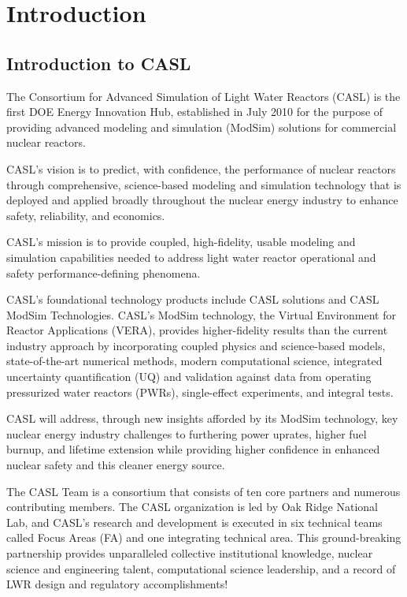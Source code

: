 
\section{Introduction}

\subsection{Introduction to CASL}
The Consortium for Advanced Simulation of Light Water Reactors (CASL) is the first
DOE Energy Innovation Hub, established in July 2010 for the purpose of providing
advanced modeling and simulation (ModSim) solutions for commercial nuclear reactors.

CASL's vision is to predict, with confidence, the performance of nuclear reactors
through comprehensive, science-based modeling and simulation technology that is
deployed and applied broadly throughout the nuclear energy industry to enhance safety,
reliability, and economics.

CASL's mission is to provide coupled, high-fidelity, usable modeling and simulation
capabilities needed to address light water reactor operational and safety performance-defining phenomena.

CASL's foundational technology products include CASL solutions and CASL ModSim Technologies.
CASL's ModSim technology, the Virtual Environment for Reactor Applications (VERA), provides
higher-fidelity results than the current industry approach by incorporating coupled physics
and science-based models, state-of-the-art numerical methods, modern computational science,
integrated uncertainty quantification (UQ) and validation against data from operating
pressurized water reactors (PWRs), single-effect experiments, and integral tests.

CASL will address, through new insights afforded by its ModSim technology, key nuclear
energy industry challenges to furthering power uprates, higher fuel burnup, and lifetime
extension while providing higher confidence in enhanced nuclear safety and this cleaner energy source.

The CASL Team is a consortium that consists of ten core partners and numerous contributing members.
The CASL organization is led by Oak Ridge National Lab, and CASL's research and development is executed
in six technical teams called Focus Areas (FA) and one integrating technical area.
This ground-breaking partnership provides unparalleled
collective institutional knowledge, nuclear science and engineering talent, computational
science leadership, and a record of LWR design and regulatory accomplishments!

